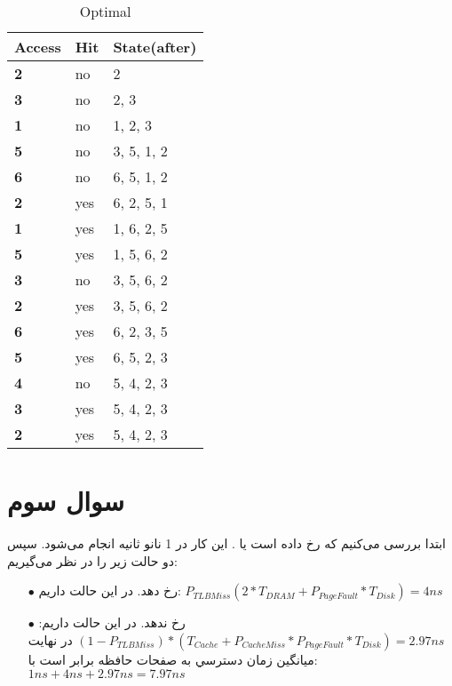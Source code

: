 \documentclass{article}
\begin{document}
\begin{latin}
\begin{table}[H]
\caption{Optimal}
\label{tab:my-table}
\begin{tabular}{|l|l|l|}
\hline
\textbf{Access} & \textbf{Hit} & \textbf{State(after)} \\ \hline
\textbf{2}      & no           & 2                     \\ \hline
\textbf{3}      & no           & 2, 3                  \\ \hline
\textbf{1}      & no           & 1, 2, 3               \\ \hline
\textbf{5}      & no           & 3, 5, 1, 2            \\ \hline
\textbf{6}      & no           & 6, 5, 1, 2            \\ \hline
\textbf{2}      & yes          & 6, 2, 5, 1            \\ \hline
\textbf{1}      & yes          & 1, 6, 2, 5            \\ \hline
\textbf{5}      & yes          & 1, 5, 6, 2            \\ \hline
\textbf{3}      & no           & 3, 5, 6, 2            \\ \hline
\textbf{2}      & yes          & 3, 5, 6, 2            \\ \hline
\textbf{6}      & yes          & 6, 2, 3, 5            \\ \hline
\textbf{5}      & yes          & 6, 5, 2, 3            \\ \hline
\textbf{4}      & no           & 5, 4, 2, 3            \\ \hline
\textbf{3}      & yes          & 5, 4, 2, 3            \\ \hline
\textbf{2}      & yes          & 5, 4, 2, 3            \\ \hline
\end{tabular}
\end{table}
\end{latin}

\section{سوال سوم}
ابتدا بررسی می‌کنیم که  رخ داده است یا . این کار در 1 نانو ثانیه انجام می‌شود. سپس دو حالت زیر را در نظر می‌گیریم:
\begin{itemize}
    \item [$\bullet$]  رخ دهد. در این حالت داریم:
$
P_{TLBMiss}(2*T_{DRAM}+P_{PageFault}*T_{Disk})=4ns
$
    \item [$\bullet$]  رخ ندهد. در این حالت داریم:
$
(1-P_{TLBMiss})*(T_{Cache}+P_{CacheMiss}*P_{PageFault}*T_{Disk})=2.97ns
$
در نهایت ميانگين زمان دسترسي به صفحات حافظه برابر است با:
$
1ns+4ns+2.97ns=7.97ns
$
\end{itemize}
\end{document}
